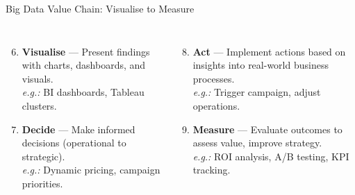 \documentclass[aspectratio=169, table]{beamer}
\begin{document}
	\begin{frame}[fragile]{Big Data Value Chain: Visualise to Measure}
		\vspace{20pt}
		\begin{columns}[t]
			\begin{enumerate}
				\setcounter{enumi}{5}
				
				
				\item \textbf{Visualise} — Present findings with charts, dashboards, and visuals.\\
				\textit{e.g.:} BI dashboards, Tableau clusters.
				
				\item \textbf{Decide} — Make informed decisions (operational to strategic).\\
				\textit{e.g.:} Dynamic pricing, campaign priorities.
			\end{enumerate}
			
			\begin{enumerate}
				\setcounter{enumi}{7}
				\item \textbf{Act} — Implement actions based on insights into real-world business processes.\\
				\textit{e.g.:} Trigger campaign, adjust operations.
				
				\item \textbf{Measure} — Evaluate outcomes to assess value, improve strategy.\\
				\textit{e.g.:} ROI analysis, A/B testing, KPI tracking.
			\end{enumerate}
		\end{columns}
	\end{frame}
	
\end{document}

